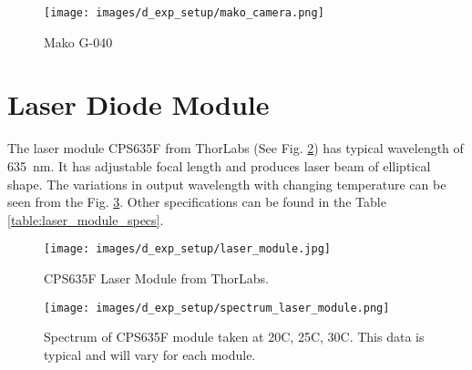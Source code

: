     \begin{figure}[h]
        \centering
        \texttt{[image: images/d\_exp\_setup/mako\_camera.png]}
        \caption{Mako G-040 \cite{mako_camera}}
        \label{fig:mako_camera.png}
    \end{figure}

\clearpage

\section*{Laser Diode Module}
    The laser module CPS635F from ThorLabs (See Fig. \ref{fig:laser_module.jpg}) has typical wavelength of \SI{635}{\nano\meter}. It has adjustable focal length and produces laser beam of elliptical shape. The variations in output wavelength with changing temperature can be seen from the Fig. \ref{fig:spectrum_laser_module.png}. Other specifications can be found in the Table \ref{table:laser_module_specs}.

    \begin{figure}[h]
        \centering
        \texttt{[image: images/d\_exp\_setup/laser\_module.jpg]}
        \caption{CPS635F Laser Module from ThorLabs. \cite{thorlabs_laser}}
        \label{fig:laser_module.jpg}
    \end{figure}

    \begin{figure}[h]
        \centering
        \texttt{[image: images/d\_exp\_setup/spectrum\_laser\_module.png]}
        \caption{Spectrum of CPS635F module taken at 20\textdegree{}C, 25\textdegree{}C, 30\textdegree{}C. This data is typical and will vary for each module. \cite{thorlabs_laser}}
        \label{fig:spectrum_laser_module.png}
    \end{figure}

